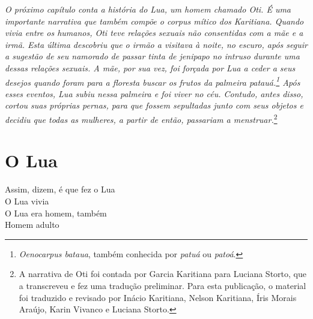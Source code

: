 
\thispagestyle{empty}
\mbox{}
\vfill
\noindent{}\textit{O próximo capítulo conta a história do Lua, um homem chamado Oti. É uma importante narrativa que também compõe o \emph{corpus} mítico dos Karitiana. Quando vivia entre os humanos, Oti teve relações sexuais não consentidas com a mãe e a irmã. Esta última descobriu que o irmão a visitava à noite, no escuro, após seguir a sugestão de seu namorado de passar tinta de jenipapo no intruso durante uma dessas relações sexuais. A mãe, por sua vez, foi forçada por Lua a ceder a seus desejos quando foram para a floresta buscar os frutos da palmeira patauá.\footnote{\emph{Oenocarpus bataua}, também conhecida por \emph{patuá} ou \emph{patoá}.} Após esses eventos, Lua subiu nessa palmeira e foi viver no céu. Contudo, antes disso, cortou suas próprias pernas, para que fossem sepultadas junto com seus objetos e decidiu que todas as mulheres, a partir de então, passariam a menstruar.}\footnote{A narrativa de Oti foi contada por Garcia Karitiana para Luciana Storto, que a transcreveu e fez uma tradução preliminar. Para esta publicação, o material foi traduzido e revisado por Inácio Karitiana, Nelson Karitiana, Íris Morais Araújo, Karin Vivanco e Luciana Storto.}
\pagebreak


\chapter*{O Lua}

\begin{linenumbers}\begingroup\raggedright
\noindent Assim, dizem, é que fez o Lua\\
O Lua vivia\\
O Lua era homem, também\\
Homem adulto
\end{linenumbers}\endgroup

\bigskip

